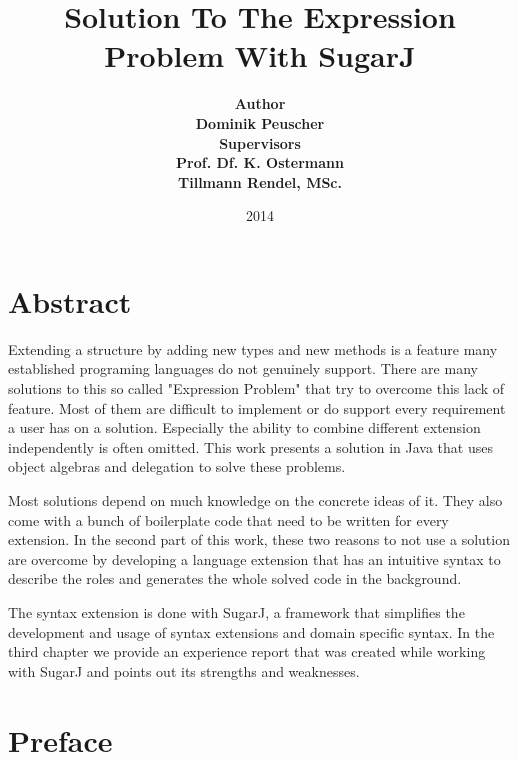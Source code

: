 \documentclass{report}
\title{Solution To The Expression Problem With SugarJ}
\author{
\bfseries Author \\
\mdseries Dominik Peuscher \\[1ex]
\bfseries Supervisors \\
\mdseries  Prof. Df. K. Ostermann\\
              Tillmann Rendel, MSc.
}
\date{2014}
\affil{Fachbereich f\"ur Mathematik, Wirtschaftsmathematik und Informatik\\ Universit\"at Marburg}
\begin{document}

\maketitle

\tableofcontents

\chapter*{Abstract}
Extending a structure by adding new types and new methods is a feature many established programing languages do not genuinely support. There are many solutions to this so called "Expression Problem" that try to overcome this lack of feature. Most of them are difficult to implement or do support every requirement a user has on a solution. Especially the ability to combine different extension independently is often omitted. This work presents a solution in Java that uses object algebras and delegation to solve these problems.

Most solutions depend on much knowledge on the concrete ideas of it. They also come with a bunch of boilerplate code that need to be written for every extension. In the second part of this work, these two reasons to not use a solution are overcome by developing a language extension that has an intuitive syntax to describe the roles and generates the whole solved code in the background.

The syntax extension is done with SugarJ, a framework that simplifies the development and usage of syntax extensions and domain specific syntax. In the third chapter we provide an experience report that was created while working with SugarJ and points out its strengths and weaknesses.


\chapter*{Preface}
\end{document}
